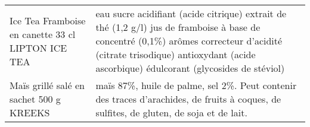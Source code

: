 \begin{longtable}{p{5cm}p{10cm}}
                                                        Ice Tea Framboise en canette 33 cl LIPTON ICE TEA &                                                                                                                                                                                                                                                                                                                                                                                                                                                                                                                                                                                                                                                                                                                                                                                                    eau  sucre  acidifiant (acide citrique)  extrait de thé (1,2 g/l)  jus de framboise à base de concentré (0,1\%)  arômes  correcteur d'acidité (citrate trisodique)  antioxydant (acide ascorbique)  édulcorant (glycosides de stéviol) \\
                                                                  Maïs grillé salé en sachet 500 g KREEKS &                                                                                                                                                                                                                                                                                                                                                                                                                                                                                                                                                                                                                                                                                                                                                                                                                                                                                                 maïs 87\%, huile de palme, sel 2\%.  Peut contenir des traces d'arachides, de fruits à coques, de sulfites, de gluten, de soja et de lait. \\

\end{longtable}
